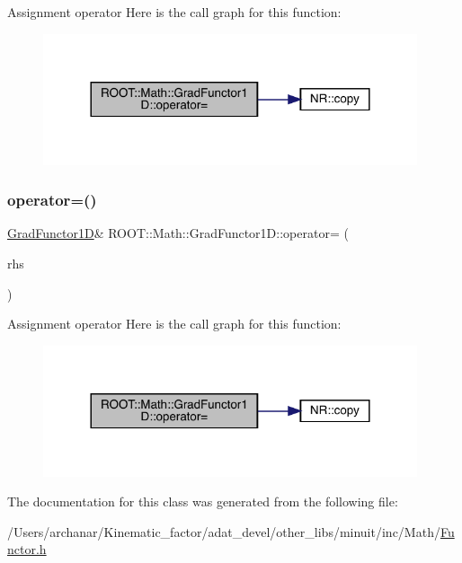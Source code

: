 Assignment operator Here is the call graph for this function\+:
\nopagebreak
\begin{figure}[H]
\begin{center}
\leavevmode
\includegraphics[width=312pt]{d3/d76/classROOT_1_1Math_1_1GradFunctor1D_a3ea006d92100ba76a6fae9f57499c60d_cgraph}
\end{center}
\end{figure}
\mbox{\label{classROOT_1_1Math_1_1GradFunctor1D_a3ea006d92100ba76a6fae9f57499c60d}} 
\subsubsection{\texorpdfstring{operator=()}{operator=()}\hspace{0.1cm}{\footnotesize\ttfamily [2/2]}}
{\footnotesize\ttfamily \mbox{\hyperlink{classROOT_1_1Math_1_1GradFunctor1D}{Grad\+Functor1D}}\& R\+O\+O\+T\+::\+Math\+::\+Grad\+Functor1\+D\+::operator= (\begin{DoxyParamCaption}\item[{const \mbox{\hyperlink{classROOT_1_1Math_1_1GradFunctor1D}{Grad\+Functor1D}} \&}]{rhs }\end{DoxyParamCaption})\hspace{0.3cm}{\ttfamily [inline]}}

Assignment operator Here is the call graph for this function\+:
\nopagebreak
\begin{figure}[H]
\begin{center}
\leavevmode
\includegraphics[width=312pt]{d3/d76/classROOT_1_1Math_1_1GradFunctor1D_a3ea006d92100ba76a6fae9f57499c60d_cgraph}
\end{center}
\end{figure}


The documentation for this class was generated from the following file\+:\begin{DoxyCompactItemize}
\item 
/\+Users/archanar/\+Kinematic\+\_\+factor/adat\+\_\+devel/other\+\_\+libs/minuit/inc/\+Math/\mbox{\hyperlink{other__libs_2minuit_2inc_2Math_2Functor_8h}{Functor.\+h}}\end{DoxyCompactItemize}
